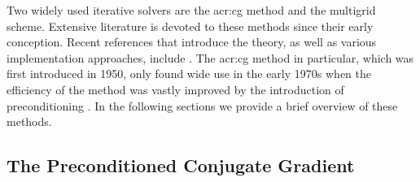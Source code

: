 Two widely used iterative solvers are the \gls{acr:cg} method and the multigrid scheme.
Extensive literature is devoted to these methods since their early conception.
Recent references that introduce the theory, as well as various implementation approaches, include \cite{bib:Saad2003IMFSLS2E,bib:Demmel1997anla,bib:Demmel1994Templates,bib:Golub1996MC,bib:Briggs2000AMT,bib:Trottenberg2001M,bib:Shewchuk1994ICG}.
The \gls{acr:cg} method in particular, which was first introduced in 1950, only found wide use in the early 1970s when the efficiency of the method was vastly improved by the introduction of preconditioning \cite{bib:Golub1989SHC}.  
In the following sections we provide a brief overview of these methods.


\subsection{The Preconditioned Conjugate Gradient}
\label{sec:pcg}

